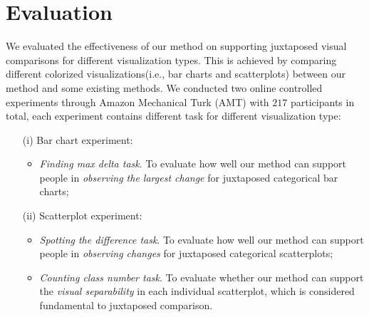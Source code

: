 \section {Evaluation}
\label{sec:results}

We evaluated the effectiveness of our method on supporting juxtaposed visual comparisons for different visualization types.
This is achieved by comparing different colorized visualizations(i.e., bar charts and scatterplots) between our method and some existing methods.
We conducted two online controlled experiments through Amazon Mechanical Turk (AMT) with $217$ participants in total, each experiment contains different task for different visualization type:
\begin{enumerate}
\item [(i)] Bar chart experiment:
    \begin{itemize}
         \item \emph{Finding max delta task}. To evaluate how well our method can support people in \emph{observing the largest change} for juxtaposed categorical bar charts;
    \end{itemize}
\item [(ii)] Scatterplot experiment:
    \begin{itemize}
         \item \emph{Spotting the difference task}. To evaluate how well our method can support people in \emph{observing changes} for juxtaposed categorical scatterplots;
         \item \emph{Counting class number task}. To evaluate whether our method can support the \emph{visual separability} in each individual scatterplot, which is considered fundamental to juxtaposed comparison.
    \end{itemize}
\end{enumerate}

